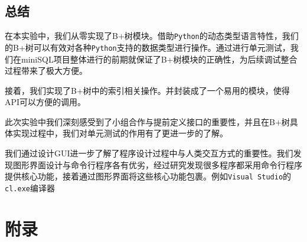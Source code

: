 \documentclass[UTF8]{ctexrep} %
\begin{document}
\chapter{总结}
在本实验中，我们从零实现了B+树模块。借助\texttt{Python}的动态类型语言特性，我们的B+树可以有效对各种\texttt{Python}支持的数据类型进行操作。通过进行单元测试，我们在miniSQL项目整体进行的前期就保证了B+树模块的正确性，为后续调试整合过程带来了极大方便。
\par
接着，我们实现了B+树中的索引相关操作。并封装成了一个易用的模块，使得API可以方便的调用。
\par
此次实验中我们深刻感受到了小组合作与提前定义接口的重要性，并且在B+树具体实现过程中，我们对单元测试的作用有了更进一步的了解。
\par
我们通过设计GUI进一步了解了程序设计过程中与人类交互方式的重要性。我们发现图形界面设计与命令行程序各有优劣，经过研究发现很多程序都采用命令行程序提供核心功能，接着通过图形界面将这些核心功能包裹。例如\texttt{Visual Studio}的\texttt{cl.exe}编译器

\newpage
\part{附录}
\end{document}
